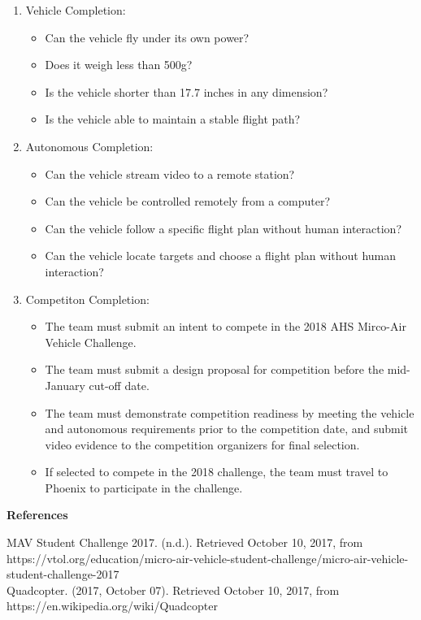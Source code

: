 \documentclass[10pt,letterpaper,onecolumn]{article}
\begin{document}
\begin{enumerate}
\item Vehicle Completion:
\begin{itemize}
\item Can the vehicle fly under its own power?
\item Does it weigh less than 500g?
\item Is the vehicle shorter than 17.7 inches in any dimension?
\item Is the vehicle able to maintain a stable flight path?
\end{itemize}
\item Autonomous Completion:
\begin{itemize}
\item Can the vehicle stream video to a remote station?
\item Can the vehicle be controlled remotely from a computer?
\item Can the vehicle follow a specific flight plan without human interaction?
\item Can the vehicle locate targets and choose a flight plan without human
interaction?
\end{itemize}
\item Competiton Completion:
\begin{itemize}
\item The team must submit an intent to compete in the 2018 AHS Mirco-Air Vehicle
Challenge.
\item The team must submit a design proposal for competition before the mid-
January cut-off date.
\item The team must demonstrate competition readiness by meeting the vehicle and
autonomous requirements prior to the competition date, and submit video evidence
to the competition organizers for final selection.
\item If selected to compete in the 2018 challenge, the team must travel to
Phoenix to participate in the challenge.
\end{itemize}
\end{enumerate}

\vspace{2cm}
\begin{center}
\large
\textbf{References}
\end{center}

\noindent
MAV Student Challenge 2017. (n.d.). Retrieved October 10, 2017, from https://vtol.org/education/micro-air-vehicle-student-challenge/micro-air-vehicle-student-challenge-2017\\
Quadcopter. (2017, October 07). Retrieved October 10, 2017, from https://en.wikipedia.org/wiki/Quadcopter
\end{document}
